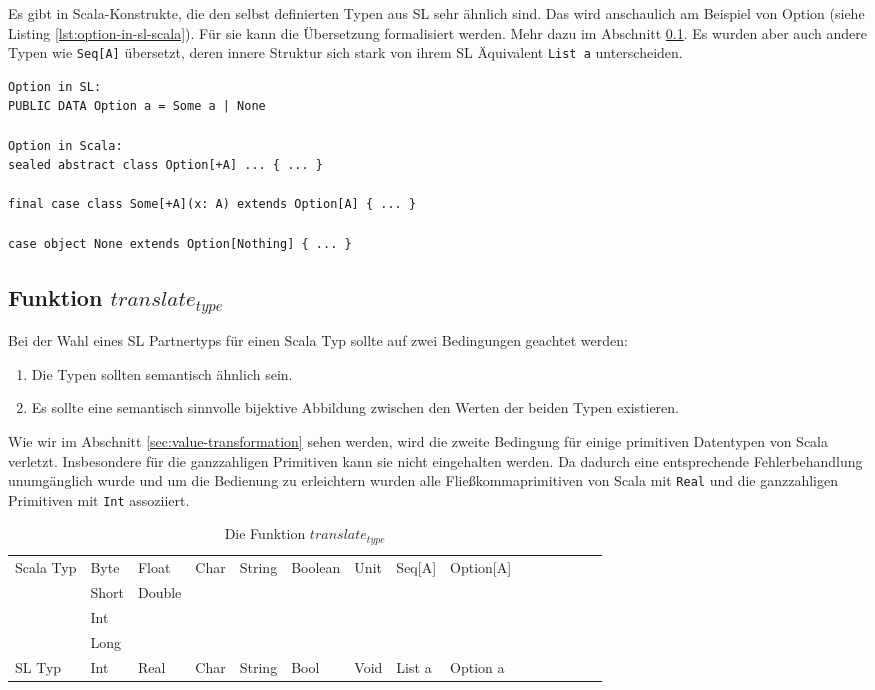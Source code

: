 \documentclass[12pt,bibtotoc]{scrreprt}
\begin{document}
Es gibt in Scala-Konstrukte, die den selbst definierten Typen aus \ac{SL} sehr ähnlich sind. Das wird anschaulich am Beispiel von Option (siehe Listing \ref{lst:option-in-sl-scala}). Für sie kann die Übersetzung formalisiert werden. Mehr dazu im Abschnitt \ref{subsec:translate_type}. Es wurden aber auch andere Typen wie \lstinline!Seq[A]! übersetzt, deren innere Struktur sich stark von ihrem SL Äquivalent \lstinline!List a! unterscheiden.

\begin{lstlisting}[caption=Option in \ac{SL} und Scala, label=lst:option-in-sl-scala, float=h]
Option in SL:
PUBLIC DATA Option a = Some a | None

Option in Scala:
sealed abstract class Option[+A] ... { ... }

final case class Some[+A](x: A) extends Option[A] { ... }

case object None extends Option[Nothing] { ... }
\end{lstlisting}

\subsection{Funktion $translate_{type}$}
\label{subsec:translate_type}


Bei der Wahl eines SL Partnertyps für einen Scala Typ sollte auf zwei Bedingungen geachtet werden:

\begin{enumerate}
 \item{Die Typen sollten semantisch ähnlich sein.}
 \item{Es sollte eine semantisch sinnvolle bijektive Abbildung zwischen den Werten der beiden Typen existieren. }
\end{enumerate}

Wie wir im Abschnitt \ref{sec:value-transformation} sehen werden, wird die zweite Bedingung für einige primitiven Datentypen von Scala verletzt. Insbesondere für die ganzzahligen Primitiven kann sie nicht eingehalten werden. Da dadurch eine entsprechende Fehlerbehandlung unumgänglich wurde und um die Bedienung zu erleichtern wurden alle Fließkommaprimitiven von Scala mit \lstinline!Real! und die ganzzahligen Primitiven mit \lstinline!Int! assoziiert.

\begin{table}[h]
\caption{Die Funktion $translate_{type}$}
\centering
\begin{tabular}{l|llllllllllllll}
Scala Typ & Byte & Float & Char & String & Boolean & Unit & Seq[A] & Option[A]\\
 & Short & Double\\
 & Int\\
 & Long\\
SL Typ & Int & Real & Char & String & Bool & Void & List a & Option a\\
\end{tabular}
\label{tab:translate_type}
\end{table}
\end{document}
